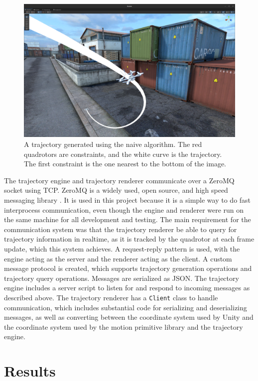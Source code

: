 \documentclass[pageno]{jpaper}
\begin{document}
\begin{figure}[hbt]
  \includegraphics[width=\linewidth]{data/constraint.png}
  \caption{A trajectory generated using the naive algorithm. The red quadrotors are constraints, and the white curve is the trajectory. The first constraint is the one nearest to the bottom of the image.}
  \label{fig:constraint}
\end{figure}

The trajectory engine and trajectory renderer communicate over a ZeroMQ socket using TCP. ZeroMQ is a widely used, open source, and high speed messaging library \cite{zmq}. It is used in this project because it is a simple way to do fast interprocess communication, even though the engine and renderer were run on the same machine for all development and testing. The main requirement for the communication system was that the trajectory renderer be able to query for trajectory information in realtime, as it is tracked by the quadrotor at each frame update, which this system achieves. A request-reply pattern is used, with the engine acting as the server and the renderer acting as the client. A custom message protocol is created, which supports trajectory generation operations and trajectory query operations. Messages are serialized as JSON. The trajectory engine includes a server script to listen for and respond to incoming messages as described above. The trajectory renderer has a \texttt{Client} class to handle communication, which includes substantial code for serializing and deserializing messages, as well as converting between the coordinate system used by Unity and the coordinate system used by the motion primitive library and the trajectory engine.

\section{Results}
\end{document}
